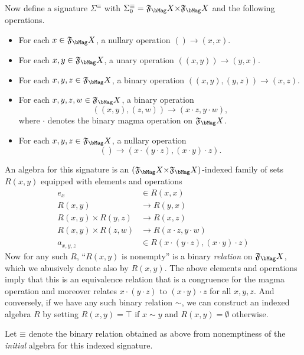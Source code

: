 \documentclass{book}
\def\sig{\Sigma}
\def\equivsym{\mathord{\equiv}}
\newcommand{\F}[1]{\mathfrak{F}_{#1}}
\def\unit{\top}%
\begin{document}
Now define a signature $\sig^{\equivsym}$ with $\sig^{\equivsym}_0 = \F\bMag X\times \F\bMag X$ and the following operations.
\begin{itemize}
\item For each $x\in \F\bMag X$, a nullary operation $() \to (x,x)$.
\item For each $x,y\in \F\bMag X$, a unary operation $((x,y)) \to (y,x)$.
\item For each $x,y,z\in \F\bMag X$, a binary operation $((x,y),(y,z)) \to (x,z)$.
\item For each $x,y,z,w\in \F\bMag X$, a binary operation \[((x,y),(z,w)) \to (x\cdot z,y\cdot w),\] where $\cdot$ denotes the binary magma operation on $\F\bMag X$.
\item For each $x,y,z\in \F\bMag X$, a nullary operation \[() \to (x\cdot (y\cdot z),(x\cdot y)\cdot z).\]
\end{itemize}
An algebra for this signature is an $(\F\bMag X\times \F\bMag X)$-indexed family of sets $R(x,y)$ equipped with elements and operations
\begin{align*}
  e_x &\in R(x,x)\\
  R(x,y) &\to R(y,x)\\
  R(x,y)\times R(y,z) &\to R(x,z)\\
  R(x,y) \times R(z,w) &\to R(x\cdot z,y\cdot w)\\
  a_{x,y,z} &\in R(x\cdot (y\cdot z),(x\cdot y)\cdot z)
\end{align*}
Now for any such $R$, ``$R(x,y)$ is nonempty'' is a binary \emph{relation} on $\F\bMag X$, which we abusively denote also by $R(x,y)$.
The above elements and operations imply that this is an equivalence relation that is a congruence for the magma operation and moreover relates $x\cdot (y\cdot z)$ to $(x\cdot y)\cdot z$ for all $x,y,z$.
And conversely, if we have any such binary relation $\sim$, we can construct an indexed algebra $R$ by setting $R(x,y) = \unit$ if $x\sim y$ and $R(x,y)=\emptyset$ otherwise.

Let $\equivsym$ denote the binary relation obtained as above from nonemptiness of the \emph{initial} algebra for this indexed signature.
\end{document}
